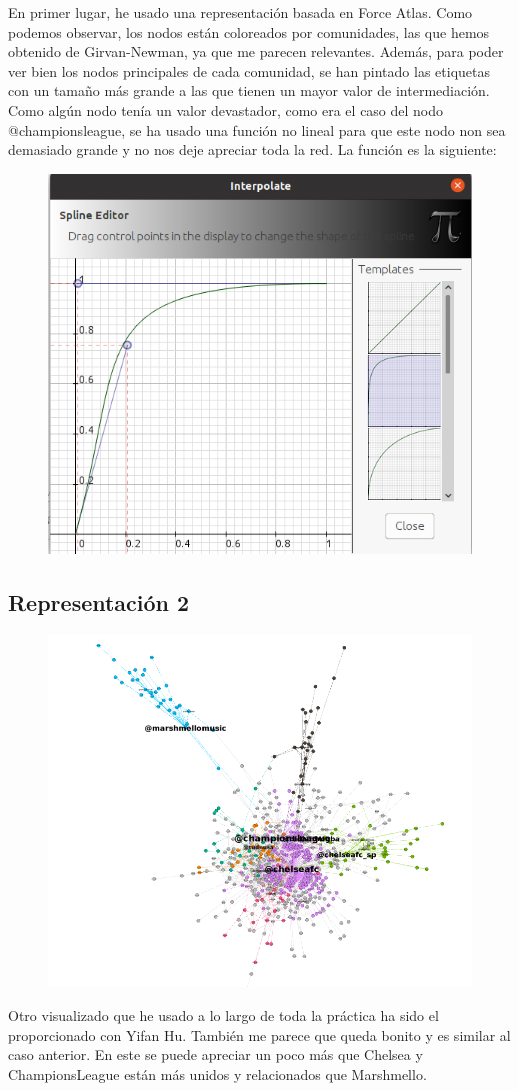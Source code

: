 En primer lugar, he usado una representación basada en Force Atlas. Como podemos observar, los nodos están coloreados por comunidades, las que hemos obtenido de Girvan-Newman, ya que me parecen relevantes. Además, para poder ver bien los nodos principales de cada comunidad, se han pintado las etiquetas con un tamaño más grande a las que tienen un mayor valor de intermediación. Como algún nodo tenía un valor devastador, como era el caso del nodo @championsleague, se ha usado una función no lineal para que este nodo non sea demasiado grande y no nos deje apreciar toda la red. La función es la siguiente:

\begin{figure}[H]
	\centering
	\includegraphics[width=0.25\linewidth]{Imagenes/screenshot018}
\end{figure}


\subsection{Representación 2}
\begin{figure}[H]
	\centering
	\includegraphics[width=0.7\linewidth]{Imagenes/screenshot019}
\end{figure}

Otro visualizado que he usado a lo largo de toda la práctica ha sido el proporcionado con Yifan Hu. También me parece que queda bonito y es similar al caso anterior. En este se puede apreciar un poco más que Chelsea y ChampionsLeague están más unidos y relacionados que Marshmello.
\newpage
